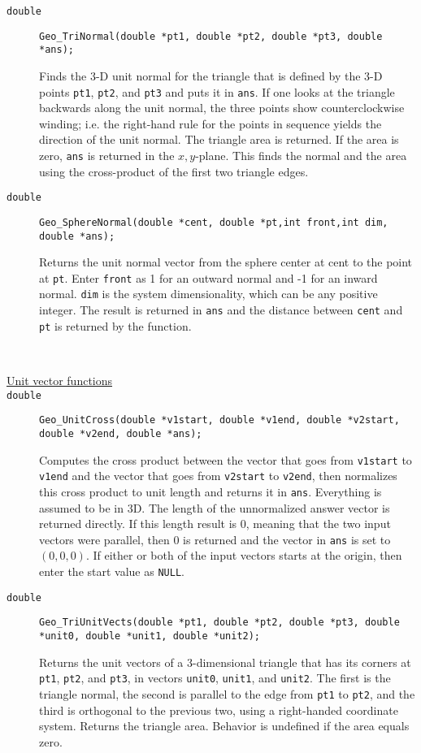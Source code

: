 \documentclass[11pt]{article}
\newcommand {\ttt} {\texttt}
\begin{document}
\begin{description}
\item[\ttt{double}]
\ttt{Geo\_TriNormal(double *pt1, double *pt2, double *pt3, double *ans);}

Finds the 3-D unit normal for the triangle that is defined by the 3-D points \ttt{pt1}, \ttt{pt2}, and \ttt{pt3} and puts it in \ttt{ans}. If one looks at the triangle backwards along the unit normal, the three points show counterclockwise winding; i.e. the right-hand rule for the points in sequence yields the direction of the unit normal. The triangle area is returned. If the area is zero, \ttt{ans} is returned in the $x,y$-plane. This finds the normal and the area using the cross-product of the first two triangle edges.

\item[\ttt{double}]
\ttt{Geo\_SphereNormal(double *cent, double *pt,int front,int dim, double *ans);}

Returns the unit normal vector from the sphere center at cent to the point at \ttt{pt}. Enter \ttt{front} as 1 for an outward normal and -1 for an inward normal. \ttt{dim} is the system dimensionality, which can be any positive integer. The result is returned in \ttt{ans} and the distance between \ttt{cent} and \ttt{pt} is returned by the function.

\hfill \\
\item[\underline{Unit vector functions}]

\item[\ttt{double}]
\ttt{Geo\_UnitCross(double *v1start, double *v1end, double *v2start, double *v2end, double *ans);}

Computes the cross product between the vector that goes from \ttt{v1start} to \ttt{v1end} and the vector that goes from \ttt{v2start} to \ttt{v2end}, then normalizes this cross product to unit length and returns it in \ttt{ans}. Everything is assumed to be in 3D. The length of the unnormalized answer vector is returned directly. If this length result is 0, meaning that the two input vectors were parallel, then 0 is returned and the vector in \ttt{ans} is set to $(0,0,0)$. If either or both of the input vectors starts at the origin, then enter the start value as \ttt{NULL}.

\item[\ttt{double}]
\ttt{Geo\_TriUnitVects(double *pt1, double *pt2, double *pt3, double *unit0, double *unit1, double *unit2);}

Returns the unit vectors of a 3-dimensional triangle that has its corners at \ttt{pt1}, \ttt{pt2}, and \ttt{pt3}, in vectors \ttt{unit0}, \ttt{unit1}, and \ttt{unit2}. The first is the triangle normal, the second is parallel to the edge from \ttt{pt1} to \ttt{pt2}, and the third is orthogonal to the previous two, using a right-handed coordinate system. Returns the triangle area. Behavior is undefined if the area equals zero.


\end{description}
\end{document}
